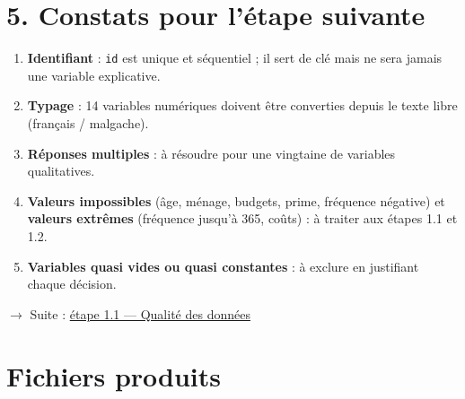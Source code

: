 \documentclass[

  french,

  10pt,

  a4paper,

]{article}
\providecommand{\tightlist}{%

  \setlength{\itemsep}{0pt}\setlength{\parskip}{0pt}}
\begin{document}
\section{5. Constats pour l'étape suivante}



\begin{enumerate}

\def\labelenumi{\arabic{enumi}.}

\tightlist

\item

  \textbf{Identifiant} : \texttt{id} est unique et séquentiel ; il sert de clé mais ne sera jamais une variable explicative.

\item

  \textbf{Typage} : 14 variables numériques doivent être converties depuis le texte libre (français / malgache).

\item

  \textbf{Réponses multiples} : à résoudre pour une vingtaine de variables qualitatives.

\item

  \textbf{Valeurs impossibles} (âge, ménage, budgets, prime, fréquence négative) et \textbf{valeurs extrêmes} (fréquence jusqu'à 365, coûts) : à traiter aux étapes 1.1 et 1.2.

\item

  \textbf{Variables quasi vides ou quasi constantes} : à exclure en justifiant chaque décision.

\end{enumerate}



\ensuremath{\rightarrow} Suite : \href{../1.1_qualite/README.pdf}{étape 1.1 --- Qualité des données}



\section{Fichiers produits}
\end{document}
